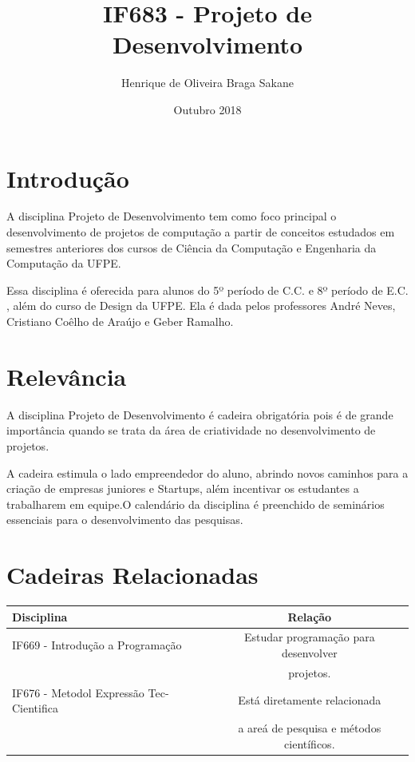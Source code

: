 \documentclass{article}
\title{IF683 - Projeto de Desenvolvimento}
\author{Henrique de Oliveira Braga Sakane }
\date{Outubro 2018}
\begin{document}
\maketitle

\section{Introdução}
A disciplina Projeto de Desenvolvimento tem como foco principal o desenvolvimento de projetos de computação a partir de conceitos estudados em semestres anteriores dos cursos de Ciência da Computação e Engenharia da Computação da UFPE.

Essa disciplina é oferecida para alunos do 5º período de C.C. e 8º período de E.C. , além do curso de Design da UFPE. Ela é dada pelos professores André Neves, Cristiano Coêlho de Araújo e Geber Ramalho.

\section{Relevância}
A disciplina Projeto de Desenvolvimento é cadeira obrigatória pois é de grande importância quando se trata da área de criatividade no desenvolvimento de projetos.

A cadeira estimula o lado empreendedor do aluno, abrindo novos caminhos para a criação de empresas juniores e Startups, além incentivar os estudantes a trabalharem em equipe.O calendário da disciplina é preenchido de seminários essenciais para o desenvolvimento das pesquisas.


\section{Cadeiras Relacionadas}
\begin{table}[h]
    \centering
    \begin{tabular}{l|c|}
    Disciplina & Relação \\
    \hline
    IF669 - Introdução a Programação & Estudar programação para desenvolver\\  &  projetos. \\
    \hline
    IF676 - Metodol Expressão Tec-Cientifica & Está diretamente relacionada \\  & a areá de pesquisa e métodos científicos. 
    \end{tabular}
    \label{tab:my_label}
\end{table}
\end{document}
